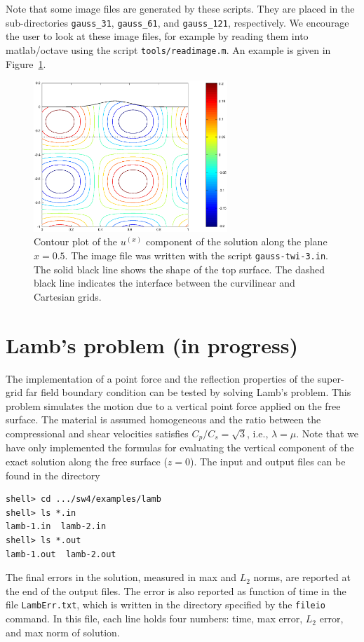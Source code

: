 \documentclass[11pt]{report}
\begin{document}
Note that some image files are generated by these scripts. They are placed in the sub-directories
\verb+gauss_31+, \verb+gauss_61+, and \verb+gauss_121+, respectively. We encourage
the user to look at these image files, for example by reading them into matlab/octave using the
script \verb+tools/readimage.m+. An example is given in Figure~\ref{fig:ux}.
\begin{figure}
\begin{center}
\includegraphics[width=0.65\textwidth]{ux.eps}
\caption{Contour plot of the $u^{(x)}$ component of the solution along the plane $x=0.5$. The image
  file was written with the script {\tt gauss-twi-3.in}. The solid black line shows the shape of the
  top surface. The dashed black line indicates the interface between the curvilinear and Cartesian
  grids.}
\label{fig:ux}
\end{center}
\end{figure}


\section{Lamb's problem (in progress)}\label{sec:lamb}

The implementation of a point force and the reflection properties of the super-grid far field
boundary condition can be tested by solving Lamb's problem. This problem simulates the motion due to
a vertical point force applied on the free surface. The material is assumed homogeneous and the
ratio between the compressional and shear velocities satisfies $C_p/C_s = \sqrt{3}$, i.e.,
$\lambda=\mu$. Note that we have only implemented the formulas for evaluating the vertical component
of the exact solution along the free surface ($z=0$).
The input and output files can be found in the directory
\begin{verbatim}
shell> cd .../sw4/examples/lamb
shell> ls *.in
lamb-1.in  lamb-2.in
shell> ls *.out
lamb-1.out  lamb-2.out
\end{verbatim}
The final errors in the solution, measured in max and $L_2$ norms, are reported at the end of the
output files. The error is also reported as function of time in the file {\tt LambErr.txt}, which is
written in the directory specified by the {\tt fileio} command. In this file, each line holds four
numbers: time, max error, $L_2$ error, and max norm of solution.
\end{document}
